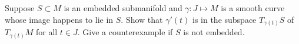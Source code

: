 Suppose $S \subset M$ is an embedded submanifold and $\gamma: J \mapsto M$ is a smooth curve whose image happens to lie in $S$.  Show that $\gamma'(t)$ is in the subspace $T_{\gamma(t)}S$ of $T_{\gamma(t)}M$ for all $t \in J$.  Give a counterexample if $S$ is not embedded.